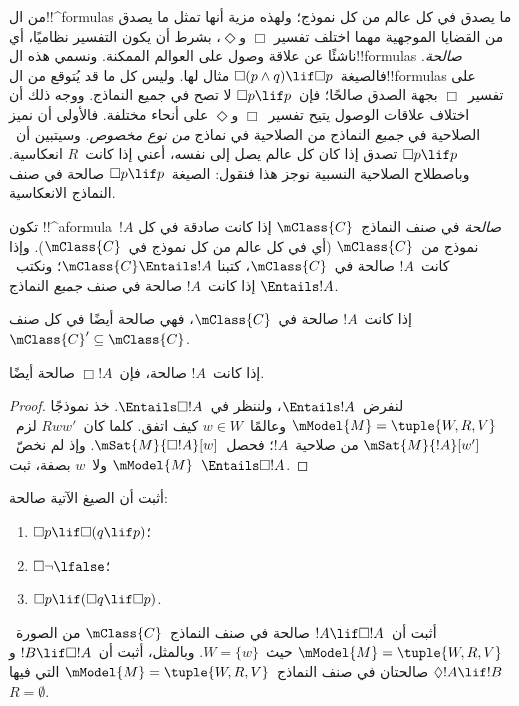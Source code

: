 \documentclass[../../../include/open-logic-section]{subfiles}
\begin{document}


\begin{explain}
  من ال!!^{formula}s ما يصدق في كل عالم من كل نموذج؛ ولهذه مزية
  أنها تمثل ما يصدق من القضايا الموجهية مهما اختلف تفسير
  $\Box$ و$\Diamond$، بشرط أن يكون التفسير نظاميًا، أي ناشئًا عن
  علاقة وصول على العوالم الممكنة. ونسمي هذه ال!!{formula}s
  \emph{صالحة}. فالصيغة~$\Box(p \land q) \lif \Box p$ مثال لها.
  وليس كل ما قد يُتوقع من ال!!{formula}s على تفسير~$\Box$ بجهة
  الصدق صالحًا؛ فإن~$\Box p \lif p$ لا تصح في جميع النماذج.
  ووجه ذلك أن اختلاف علاقات الوصول يتيح تفسير~$\Box$ و$\Diamond$
  على أنحاء مختلفة. فالأولى أن نميز الصلاحية في \emph{جميع}
  النماذج من الصلاحية في نماذج \emph{من نوع مخصوص}.
  وسيتبين أن~$\Box p \lif p$ تصدق إذا كان كل عالم يصل إلى نفسه،
  أعني إذا كانت~$R$ انعكاسية. وباصطلاح الصلاحية النسبية نوجز هذا
  فنقول: الصيغة~$\Box p \lif p$ صالحة في صنف النماذج الانعكاسية.
\end{explain}

\begin{defn}
  تكون !!^a{formula}~$!A$ \emph{صالحة} في صنف النماذج~$\mClass{C}$
  إذا كانت صادقة في كل نموذج من~$\mClass{C}$ (أي في كل عالم من كل
  نموذج في~$\mClass{C}$). وإذا كانت~$!A$ صالحة في~$\mClass{C}$، كتبنا
  $\mClass{C} \Entails !A$؛ ونكتب~$\Entails !A$ إذا كانت~$!A$ صالحة
  في صنف \emph{جميع} النماذج.
\end{defn}

\begin{prop}
  إذا كانت~$!A$ صالحة في~$\mClass{C}$، فهي صالحة أيضًا في كل صنف
  $\mClass{C}' \subseteq \mClass{C}$.
\end{prop}

\begin{prop}
  إذا كانت~$!A$ صالحة، فإن~$\Box!A$ صالحة أيضًا.
\end{prop}

\begin{proof}
  لنفرض~$\Entails !A$، ولننظر في~$\Entails \Box!A$. خذ نموذجًا
  $\mModel{M} = \tuple{W, R, V}$ وعالمًا~$w \in W$ كيف اتفق.
  كلما كان~$Rww'$ لزم~$\mSat{M}{!A}[w']$ من صلاحية~$!A$؛
  فحصل~$\mSat{M}{\Box!A}[w]$. وإذ لم نخصّ~$\mModel{M}$ ولا~$w$
  بصفة، ثبت~$\Entails \Box!A$.
\end{proof}

\begin{prob}
  أثبت أن الصيغ الآتية صالحة:
  \begin{enumerate}
  \item $\Box p \lif \Box (q \lif p)$؛
  \item $\Box \lnot \lfalse$؛
  \item $\Box p \lif (\Box q \lif \Box p)$.
  \end{enumerate}
\end{prob}

\begin{prob}
  أثبت أن~$!A \lif \Box!A$ صالحة في صنف النماذج~$\mClass{C}$ من
  الصورة~$\mModel{M} = \tuple{W, R, V}$ حيث~$W = \{w\}$. وبالمثل،
  أثبت أن~$!B \lif \Box !A$ و$\Diamond !A \lif !B$ صالحتان في صنف
  النماذج~$\mModel{M} = \tuple{W, R, V}$ التي فيها
  $R = \emptyset$.
\end{prob}
\end{document}

